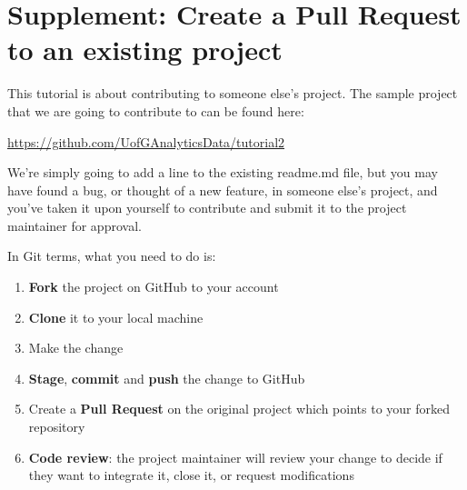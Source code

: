 \documentclass[
  letterpaper,
  DIV=11,
  numbers=noendperiod]{scrartcl}
\providecommand{\tightlist}{%
  \setlength{\itemsep}{0pt}\setlength{\parskip}{0pt}}\usepackage{longtable,booktabs,array}
\begin{document}
\hypertarget{supplement-create-a-pull-request-to-an-existing-project}{%
\section{Supplement: Create a Pull Request to an existing
project}\label{supplement-create-a-pull-request-to-an-existing-project}}

This tutorial is about contributing to someone else's project. The
sample project that we are going to contribute to can be found here:

\url{https://github.com/UofGAnalyticsData/tutorial2}

We're simply going to add a line to the existing readme.md file, but you
may have found a bug, or thought of a new feature, in someone else's
project, and you've taken it upon yourself to contribute and submit it
to the project maintainer for approval.

In Git terms, what you need to do is:

\begin{enumerate}
\def\labelenumi{\arabic{enumi}.}
\tightlist
\item
  \textbf{Fork} the project on GitHub to your account
\item
  \textbf{Clone} it to your local machine
\item
  Make the change
\item
  \textbf{Stage}, \textbf{commit} and \textbf{push} the change to GitHub
\item
  Create a \textbf{Pull Request} on the original project which points to
  your forked repository
\item
  \textbf{Code review}: the project maintainer will review your change
  to decide if they want to integrate it, close it, or request
  modifications
\end{enumerate}
\end{document}
